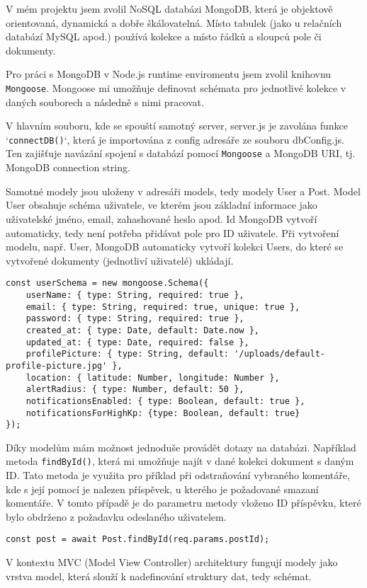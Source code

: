\par V mém projektu jsem zvolil NoSQL databázi MongoDB, která je objektově orientovaná, dynamická a dobře škálovatelná. Místo tabulek (jako u relačních databází MySQL apod.) používá kolekce a místo řádků a sloupců pole či dokumenty. 
\par Pro práci s MongoDB v Node.js runtime enviromentu jsem zvolil knihovnu \texttt{Mongoose}. Mongoose mi umožňuje definovat schémata pro jednotlivé kolekce v daných souborech a následně s nimi pracovat.
\par V hlavním souboru, kde se spouští samotný server, server.js je zavolána funkce `\texttt{connectDB()}`, která je importována z config adresáře ze souboru dbConfig.js. Ten zajišťuje navázání spojení s databází pomocí \texttt{Mongoose} a MongoDB URI, tj. MongoDB connection string.
\par Samotné modely jsou uloženy v adresáři models, tedy modely User a Post. Model User obsahuje schéma uživatele, ve kterém jsou základní informace jako uživatelské jméno, email, zahashované heslo apod. Id MongoDB vytvoří automaticky, tedy není potřeba přidávat pole pro ID uživatele. Při vytvoření modelu, např. User,  MongoDB automaticky vytvoří kolekci Users, do které se vytvořené dokumenty (jednotliví uživatelé) ukládají.
\begin{lstlisting}[caption = {Schéma User},label = {lst:stranka}]
const userSchema = new mongoose.Schema({
    userName: { type: String, required: true },
    email: { type: String, required: true, unique: true },
    password: { type: String, required: true },
    created_at: { type: Date, default: Date.now },
    updated_at: { type: Date, required: false },
    profilePicture: { type: String, default: '/uploads/default-profile-picture.jpg' },
    location: { latitude: Number, longitude: Number },
    alertRadius: { type: Number, default: 50 },
    notificationsEnabled: { type: Boolean, default: true },
    notificationsForHighKp: {type: Boolean, default: true}
});
\end{lstlisting}
\par Díky modelům mám možnost jednoduše provádět dotazy na databázi. Například metoda \texttt{findById()}, která mi umožňuje najít v dané kolekci dokument s daným ID. Tato metoda je využita pro příklad při odstraňování vybraného komentáře, kde s její pomocí je nalezen příspěvek, u kterého je požadované smazaní komentáře. V tomto případě je do parametru metody vloženo ID příspěvku, které bylo obdrženo z požadavku odeslaného uživatelem.
\begin{lstlisting}[caption = {Metoda pro nalezení příspěvku pomocí ID},label = {lst:stranka}]
    const post = await Post.findById(req.params.postId);
\end{lstlisting}
\par V kontextu MVC (Model View Controller) architektury fungují modely jako vrstva model, která slouží k nadefinování struktury dat, tedy schémat.

